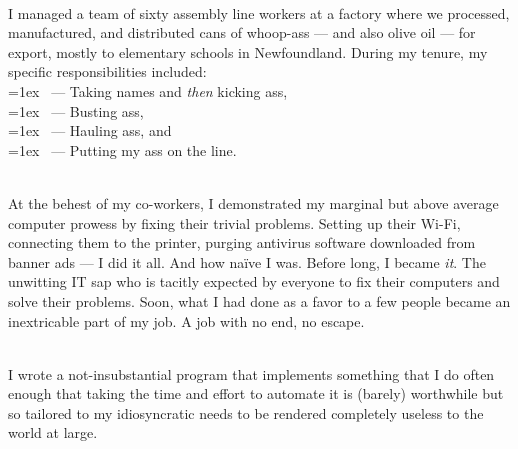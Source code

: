 \documentclass{resume}
\begin{document}
\begin{minipage}[t]{0.67\textwidth}



\begin{resumestyle}

 \\
I managed a team of sixty assembly line workers at a factory where we
processed, manufactured, and distributed cans of whoop-ass --- and also olive
oil --- for export, mostly to elementary schools in Newfoundland. During my
tenure, my specific responsibilities included: \\
\vspace{0.5ex}
\hangindent=1ex \ --- Taking names and \textit{then} kicking ass, \\
\hangindent=1ex \ --- Busting ass, \\
\hangindent=1ex \ --- Hauling ass, and \\
\hangindent=1ex \ --- Putting my ass on the line. \\
\sectionsep%

 \\
At the behest of my co-workers, I demonstrated my marginal but above average
computer prowess by fixing their trivial problems. Setting up their Wi-Fi,
connecting them to the printer, purging antivirus software downloaded from
banner ads --- I did it all. And how naïve I was. Before long, I became
\textit{it}. The unwitting IT sap who is tacitly expected by everyone to fix
their computers and solve their problems. Soon, what I had done as a favor to a
few people became an inextricable part of my job. A job with no end, no escape.

\end{resumestyle}



\begin{resumestyle}

 \\
I wrote a not-insubstantial program that implements something that I do often
enough that taking the time and effort to automate it is (barely) worthwhile
but so tailored to my idiosyncratic needs to be rendered completely useless to
the world at large.
\sectionsep%


\end{resumestyle}
\end{minipage}
\end{document}
